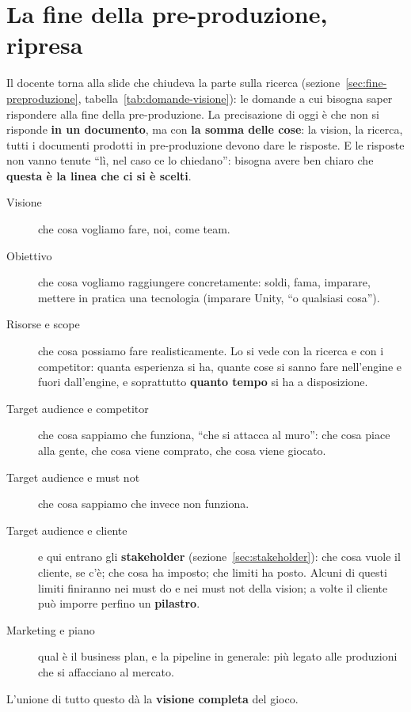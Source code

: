 \section{La fine della pre-produzione, ripresa}
\label{gd9:sec:fine-preproduzione}

Il docente torna alla slide che chiudeva la parte sulla ricerca
(sezione~\ref{sec:fine-preproduzione}, tabella~\ref{tab:domande-visione}): le
domande a cui bisogna saper rispondere alla fine della pre-produzione. La
precisazione di oggi è che non si risponde \textbf{in un documento}, ma con
\textbf{la somma delle cose}: la vision, la ricerca, tutti i documenti
prodotti in pre-produzione devono dare le risposte. E le risposte non vanno
tenute ``lì, nel caso ce lo chiedano'': bisogna avere ben chiaro che
\textbf{questa è la linea che ci si è scelti}.
\begin{description}
  \item[Visione] che cosa vogliamo fare, noi, come team.
  \item[Obiettivo] che cosa vogliamo raggiungere concretamente: soldi, fama,
        imparare, mettere in pratica una tecnologia (imparare Unity, ``o
        qualsiasi cosa'').
  \item[Risorse e scope] che cosa possiamo fare realisticamente. Lo si vede
        con la ricerca e con i competitor: quanta esperienza si ha, quante
        cose si sanno fare nell'engine e fuori dall'engine, e soprattutto
        \textbf{quanto tempo} si ha a disposizione.
  \item[Target audience e competitor] che cosa sappiamo che funziona, ``che
        si attacca al muro'': che cosa piace alla gente, che cosa viene
        comprato, che cosa viene giocato.
  \item[Target audience e must not] che cosa sappiamo che invece non
        funziona.
  \item[Target audience e cliente] e qui entrano gli
        \textbf{stakeholder} (sezione~\ref{sec:stakeholder}): che cosa vuole
        il cliente, se c'è; che cosa ha imposto; che limiti ha posto. Alcuni
        di questi limiti finiranno nei must do e nei must not della vision;
        a volte il cliente può imporre perfino un \textbf{pilastro}.
  \item[Marketing e piano] qual è il business plan, e la pipeline in
        generale: più legato alle produzioni che si affacciano al mercato.
\end{description}
L'unione di tutto questo dà la \textbf{visione completa} del gioco.

